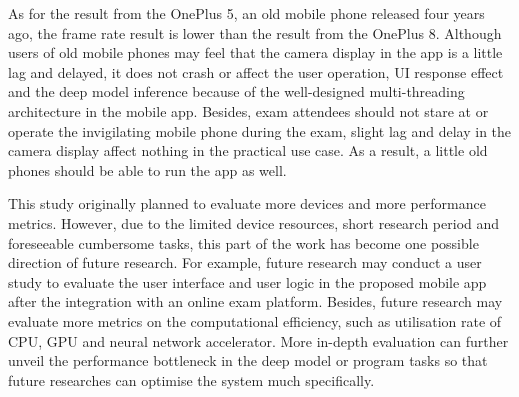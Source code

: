 As for the result from the OnePlus 5, an old mobile phone released four years ago, the frame rate result is lower than the result from the OnePlus 8.
Although users of old mobile phones may feel that the camera display in the app is a little lag and delayed, it does not crash or affect the user operation, UI response effect and the deep model inference because of the well-designed multi-threading architecture in the mobile app.
Besides, exam attendees should not stare at or operate the invigilating mobile phone during the exam, slight lag and delay in the camera display affect nothing in the practical use case.
As a result, a little old phones should be able to run the app as well.

This study originally planned to evaluate more devices and more performance metrics.
However, due to the limited device resources, short research period and foreseeable cumbersome tasks, this part of the work has become one possible direction of future research.
For example, future research may conduct a user study to evaluate the user interface and user logic in the proposed mobile app after the integration with an online exam platform.
Besides, future research may evaluate more metrics on the computational efficiency, such as utilisation rate of CPU, GPU and neural network accelerator.
More in-depth evaluation can further unveil the performance bottleneck in the deep model or program tasks so that future researches can optimise the system much specifically.
